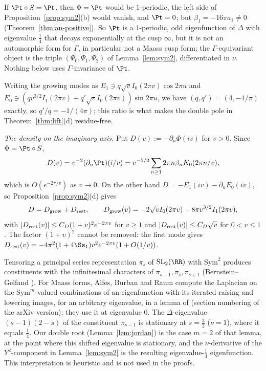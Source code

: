 \begin{remark}\label{rem:not-invariant}
If $\Pt\circ S=\Pt$, then $\Phi=\Pt$ would be $1$-periodic, the left side of Proposition~\ref{prop:sym2}(b) would vanish, and $\Pt=0$; but
$\beta_1=-16\pi a_1\ne0$ (Theorem~\ref{thm:an-positive}). So $\Pt$ is a $1$-periodic, odd eigenfunction of $\Delta$ with eigenvalue $\frac14$
that decays exponentially at the cusp $\infty$, but it is not an automorphic form for $\Gamma$, in particular not a Maass cusp form; the
$\Gamma$-equivariant object is the triple $(\Psi_0,\Psi_1,\Psi_2)$ of Lemma~\ref{lem:sym2}, differentiated in $\nu$. Nothing below uses
$\Gamma$-invariance of $\Pt$.
\end{remark}

Writing the growing modes as $E_1\ni q\sqrt vI_0(2\pi v)\cos2\pi u$ and $E_0\ni(qv^{3/2}I_1(2\pi v)+q'\sqrt vI_0(2\pi v))\sin2\pi u$, we have
$(q,q')=(4,-1/\pi)$ exactly, so $q'/q=-1/(4\pi)$; this ratio is what makes the double pole in Theorem~\ref{thm:lift}(d) residue-free.

\emph{The density on the imaginary axis.} Put $D(v):=-\partial_u\Phi(iv)$ for $v>0$. Since $\Phi=\Pt\circ S$,
\begin{equation}\label{eq:D-cusp0}
D(v)=v^{-2}(\partial_u\Pt)(i/v)=v^{-5/2}\sum_{n\ge1}2\pi n\beta_nK_0(2\pi n/v),
\end{equation}
which is $O(e^{-2\pi/v})$ as $v\to0$. On the other hand $D=-E_1(iv)-\partial_uE_0(iv)$, so Proposition~\ref{prop:sym2}(d) gives
\begin{equation}\label{eq:D-split}
D=D_{\rm grow}+D_{\rm rest},\qquad D_{\rm grow}(v)=-2\sqrt vI_0(2\pi v)-8\pi v^{3/2}I_1(2\pi v),
\end{equation}
with $|D_{\rm rest}(v)|\le C_D(1+v)^2e^{-2\pi v}$ for $v\ge1$ and $|D_{\rm rest}(v)|\le C_D\sqrt v$ for $0<v\le1$. The factor $(1+v)^2$ cannot be
removed: the first mode gives $D_{\rm rest}(v)=-4\pi^2(1+4\Ss_1)v^2e^{-2\pi v}(1+O(1/v))$.

\begin{remark}\label{rem:rep}
Tensoring a principal series representation $\pi_s$ of $\mathrm{SL}_2(\RR)$ with $\mathrm{Sym}^2$ produces constituents with the infinitesimal
characters of $\pi_{s-1},\pi_s,\pi_{s+1}$ (Bernstein--Gelfand \cite{BG80}). For Maass forms, Alfes, Burban and Raum compute the
Laplacian on the $\mathrm{Sym}^m$-valued combinations of an eigenfunction with its iterated raising and lowering images, for an arbitrary
eigenvalue, in a lemma of \cite[\S4.4]{ABR25} (section numbering of the arXiv version); they use it at eigenvalue $0$. The $\Delta$-eigenvalue
$(s-1)(2-s)$ of the constituent $\pi_{s-1}$ is stationary at $s=\frac32$ ($\nu=1$), where it equals $\frac14$. Our double root
(Lemma~\ref{lem:jordan}) is the case $m=2$ of that lemma, at the point where this shifted eigenvalue is stationary, and the $\nu$-derivative of
the $Y^2$-component in Lemma~\ref{lem:sym2} is the resulting eigenvalue-$\frac14$ eigenfunction. This interpretation is heuristic and is not
used in the proofs.
\end{remark}
